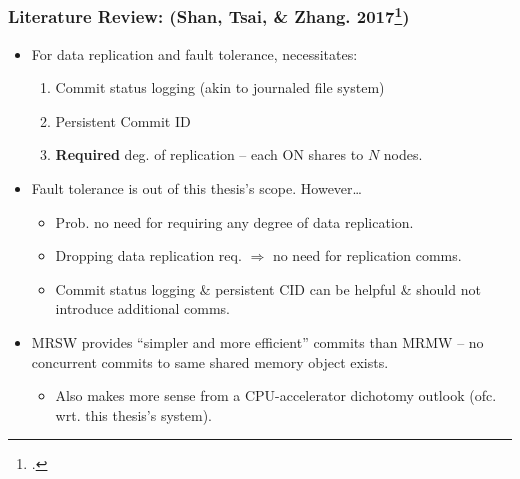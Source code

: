 \documentclass{beamer}
\begin{document}
\begin{frame}
    \frametitle{
        Literature Review: (Shan, Tsai, \& Zhang. 2017\footcite{shan2017distributed})
    }
    \begin{itemize}
        \item {
            For data replication and fault tolerance, necessitates:
            \begin{enumerate}
                \item Commit status logging (akin to journaled file system)
                \item Persistent Commit ID
                \item \textbf{Required} deg. of replication -- each ON shares to $N$ nodes.
            \end{enumerate}
        }
        \item {
            Fault tolerance is out of this thesis's scope. However\dots
            \begin{itemize}
                \item Prob. no need for requiring any degree of data replication.
                \item Dropping data replication req. $\Rightarrow$ no need for replication comms.
                \item Commit status logging \& persistent CID can be helpful \& should not introduce additional comms.
            \end{itemize}
        }
        \item {
            MRSW provides ``simpler and more efficient'' commits than MRMW -- no concurrent
            commits to same shared memory object exists.
            \begin{itemize}
                \item Also makes more sense from a CPU-accelerator dichotomy outlook (ofc. wrt. this thesis's system).
            \end{itemize}
        }
    \end{itemize}
\end{frame}
\end{document}
